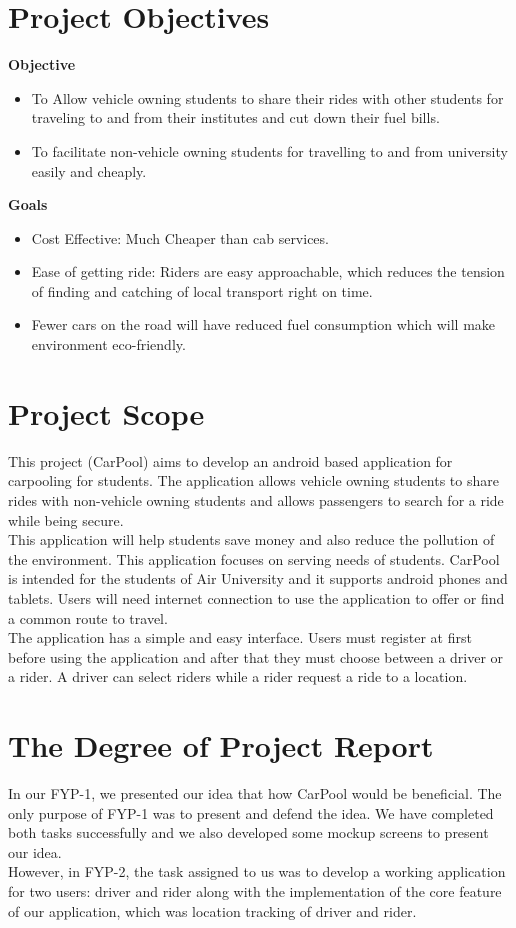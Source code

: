 \section{Project Objectives}
\textbf{Objective}
\begin{itemize}

\item To Allow vehicle owning students to share their rides with other students for traveling to and from their institutes and cut down their fuel bills.

\item To facilitate non-vehicle owning students for travelling to and from university easily and cheaply.

\end{itemize}
\textbf{Goals}
\begin{itemize}

\item Cost Effective: Much Cheaper than cab services.
\item Ease of getting ride: Riders are easy approachable, which reduces the tension of finding and catching of local transport right on time.
\item Fewer cars on the road will have reduced fuel consumption which will make environment eco-friendly.
\end{itemize}

\section{Project Scope}
This project (CarPool) aims to develop an android based application for carpooling for students. The application allows vehicle owning students to share rides with non-vehicle owning students and allows passengers to search for a ride while being secure.\\

This application will help students save money and also reduce the pollution of the environment. This application focuses on serving needs of students. CarPool is intended for the students of Air University and it supports android phones and tablets. Users will need internet connection to use the application to oﬀer or ﬁnd a common route to travel.\\

The application has a simple and easy interface. Users must register at ﬁrst before using the application and after that they must choose between a driver or a rider. A driver can select riders while a rider request a ride to a location.

\section{The Degree of Project Report}
In our FYP-1, we presented our idea that how CarPool would be beneficial. The only purpose of FYP-1 was to present and defend the idea. We have completed both tasks successfully and we also developed some mockup screens to present our idea.\\

However, in FYP-2, the task assigned to us was to develop a working application for two users: driver and rider along with the implementation of the core feature of our application, which was location tracking of driver and rider.
